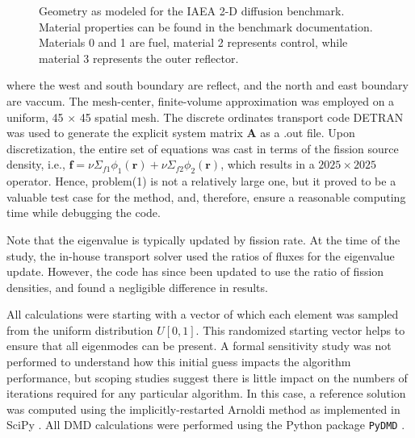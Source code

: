 \begin{figure}[htb!]
\caption{Geometry as modeled for the IAEA 2-D diffusion benchmark.  Material properties can be found in the benchmark documentation.  Materials 0 and 1 are fuel, material 2 represents control, while material 3 represents the outer reflector.}
\label{fig:iaea2d}
\end{figure}

where the west and south boundary are reflect, and the north and east boundary are vaccum.
The mesh-center, finite-volume approximation was employed on a uniform, 45 $\times$ 45 spatial mesh.
The discrete ordinates transport code DETRAN was used to generate the explicit system matrix $\mathbf{A}$ as a .out file.
Upon discretization, the entire set of equations was cast in terms of the fission source density, i.e., $\mathbf{f} = \nu\Sigma_{f1}\phi_1(\mathbf{r}) + \nu\Sigma_{f2}\phi_2(\mathbf{r})$, which results in a $2025 \times 2025$ operator. 
Hence, problem(1) is not a relatively large one, but it proved to be a valuable test case for the method, and, therefore, ensure a reasonable computing time while debugging the code.

Note that the eigenvalue is typically updated by fission rate.
At the time of the study, the in-house transport solver used the ratios of fluxes for the eigenvalue update.
However, the code has since been updated to use the ratio of fission densities, and found a negligible difference in results.

All calculations were starting with a vector of which each element was sampled from the uniform distribution $U[0, 1]$. 
This randomized starting vector helps to ensure that all eigenmodes can be present.
A formal sensitivity study was not performed to understand how this initial guess impacts the algorithm performance, but scoping studies suggest there is little impact on the numbers of iterations required for any particular algorithm.
In this case, a reference solution was computed using the implicitly-restarted Arnoldi method as implemented in SciPy \cite{scipy}.
All DMD calculations were performed using the Python package {\tt PyDMD} \cite{pydmd}.

